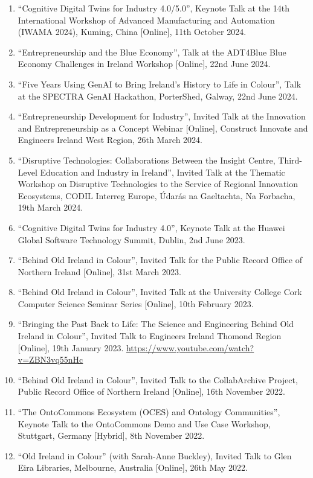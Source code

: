 \documentclass[10pt,a4paper]{res} %
\begin{document}
\begin{resume}
\begin{enumerate}
\item ``Cognitive Digital Twins for Industry 4.0/5.0'', Keynote Talk at the 14th International Workshop of Advanced Manufacturing and Automation (IWAMA 2024), Kuming, China [Online], 11th October 2024.
\item ``Entrepreneurship and the Blue Economy'', Talk at the ADT4Blue Blue Economy Challenges in Ireland Workshop [Online], 22nd June 2024.
\item ``Five Years Using GenAI to Bring Ireland's History to Life in Colour'', Talk at the SPECTRA GenAI Hackathon, PorterShed, Galway, 22nd June 2024.
\item ``Entrepreneurship Development for Industry'', Invited Talk at the Innovation and Entrepreneurship as a Concept Webinar [Online], Construct Innovate and Engineers Ireland West Region, 26th March 2024.
\item ``Disruptive Technologies: Collaborations Between the Insight Centre, Third-Level Education and Industry in Ireland'', Invited Talk at the Thematic Workshop on Disruptive Technologies to the Service of Regional Innovation Ecosystems, CODIL Interreg Europe, \'{U}dar\'{a}s na Gaeltachta, Na Forbacha, 19th March 2024.
\item ``Cognitive Digital Twins for Industry 4.0'', Keynote Talk at the Huawei Global Software Technology Summit, Dublin, 2nd June 2023.
\item ``Behind Old Ireland in Colour'', Invited Talk for the Public Record Office of Northern Ireland [Online], 31st March 2023.
\item ``Behind Old Ireland in Colour'', Invited Talk at the University College Cork Computer Science Seminar Series [Online], 10th February 2023.
\item ``Bringing the Past Back to Life: The Science and Engineering Behind Old Ireland in Colour'', Invited Talk to Engineers Ireland Thomond Region [Online], 19th January 2023. \url{https://www.youtube.com/watch?v=ZBN3vq55nHc}
\item ``Behind Old Ireland in Colour'', Invited Talk to the CollabArchive Project, Public Record Office of Northern Ireland [Online], 16th November 2022.
\item ``The OntoCommons Ecosystem (OCES) and Ontology Communities'', Keynote Talk to the OntoCommons Demo and Use Case Workshop, Stuttgart, Germany [Hybrid], 8th November 2022.
\item ``Old Ireland in Colour'' (with Sarah-Anne Buckley), Invited Talk to Glen Eira Libraries, Melbourne, Australia [Online], 26th May 2022.

\end{enumerate}
\end{resume}
\end{document}
